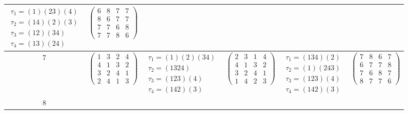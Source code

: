 \begin{longtable}{|c|p{2.7cm}|p{2.7cm}|p{2.7cm}|p{2.7cm}|p{2.7cm}|}
    $\begin{array}{l}\tau_{1}=(1)(23)(4)\\ \tau_{2}=(14)(2)(3)\\ \tau_{3}=(12)(34)\\ \tau_{4}=(13)(24)\end{array}$ &
    $\begin{pmatrix} 6 & 8 & 7 & 7 \\ 8 & 6 & 7 & 7 \\ 7 & 7 & 6 & 8 \\ 7 & 7 & 8 & 6 \end{pmatrix}$                                                                                           \\
    \hline
    7                                                                                                              &
    $\begin{pmatrix} 1 & 3 & 2 & 4 \\ 4 & 1 & 3 & 2 \\ 3 & 2 & 4 & 1 \\ 2 & 4 & 1 & 3 \end{pmatrix}$               &
    $\begin{array}{l}\tau_{1}=(1)(2)(34)\\ \tau_{2}=(1324)\\ \tau_{3}=(123)(4)\\ \tau_{4}=(142)(3)\end{array}$     &
    $\begin{pmatrix} 2 & 3 & 1 & 4 \\ 4 & 1 & 3 & 2 \\ 3 & 2 & 4 & 1 \\ 1 & 4 & 2 & 3 \end{pmatrix}$               &
    $\begin{array}{l}\tau_{1}=(134)(2)\\ \tau_{2}=(1)(243)\\ \tau_{3}=(123)(4)\\ \tau_{4}=(142)(3)\end{array}$     &
    $\begin{pmatrix} 7 & 8 & 6 & 7 \\ 6 & 7 & 7 & 8 \\ 7 & 6 & 8 & 7 \\ 8 & 7 & 7 & 6 \end{pmatrix}$                                                                                           \\
    \hline
    8                                                                                                              &

\end{longtable}
